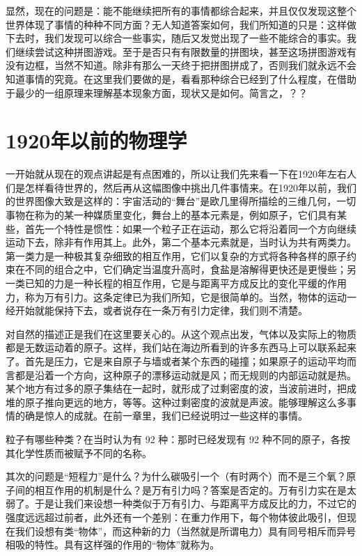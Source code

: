 显然，现在的问题是：能不能继续把所有的事情都综合起来，并且仅仅发现这整个世界体现了事情的种种不同方面？无人知道答案如何，我们所知道的只是：这样做下去时，我们发现可以综合一些事实，随后又发觉出现了一些不能综合的事实。我们继续尝试这种拼图游戏。至于是否只有有限数量的拼图块，甚至这场拼图游戏有没有边框，当然不知道。除非有那么一天终于把拼图拼成了，否则我们就永远不会知道事情的究竟。在这里我们要做的是，看看那种综合已经到了什么程度，在借助于最少的一组原理来理解基本现象方面，现状又是如何。简言之，？？

\section{1920年以前的物理学}

一开始就从现在的观点讲起是有点困难的，所以让我们先来看一下在1920年左右人们是怎样看待世界的，然后再从这幅图像中挑出几件事情来。在1920年以前，我们的世界图像大致是这样的：宇宙活动的“舞台”是欧几里得所描绘的三维几何，一切事物在称为的某一种媒质里变化，舞台上的基本元素是，例如原子，它们具有某些，首先一个特性是惯性：如果一个粒子正在运动，那么它将沿着同一个方向继续运动下去，除非有作用其上。此外，第二个基本元素就是，当时认为共有两类力。第一类力是一种极其复杂细致的相互作用，它们以复杂的方式将各种各样的原子约束在不同的组合之中，它们确定当温度升高时，食盐是溶解得更快还是更慢些；另一类已知的力是一种长程的相互作用，它是与距离平方成反比的变化平缓的作用力，称为万有引力。这条定律已为我们所知，它是很简单的。当然，物体的运动一经开始就能保持下去，或者说存在一条万有引力定律，我们则不清楚。

对自然的描述正是我们在这里要关心的。从这个观点出发，气体以及实际上的物质都是无数运动着的原子。这样，我们站在海边所看到的许多东西马上可以联系起来了。首先是压力，它是来自原子与墙或者某个东西的碰撞；如果原子的运动平均而言都是沿着一个方向，这种原子的漂移运动就是风；而无规则的内部运动就是热。某个地方有过多的原子集结在一起时，就形成了过剩密度的波，当波前进时，把成堆的原子推向更远的地方，等等。这种过剩密度的波就是声波。能够理解这么多事情的确是惊人的成就。在前一章里，我们已经说明过一些这样的事情。

粒子有哪些种类？在当时认为有 92 种：那时已经发现有 92 种不同的原子，各按其化学性质而被赋予不同的名称。

其次的问题是“短程力”是什么？为什么碳吸引一个（有时两个）而不是三个氧？原子间的相互作用的机制是什么？是万有引力吗？答案是否定的。万有引力实在是太弱了。于是让我们来设想一种类似于万有引力、与距离平方成反比的力，不过它的强度远远超过前者，此外还有一个差别：在重力作用下，每个物体彼此吸引，但现在我们设想有类“物体”，而这种新的力（当然就是所谓电力）具有同号相斥而异号相吸的特性。具有这样强的作用的“物体”就称为。

